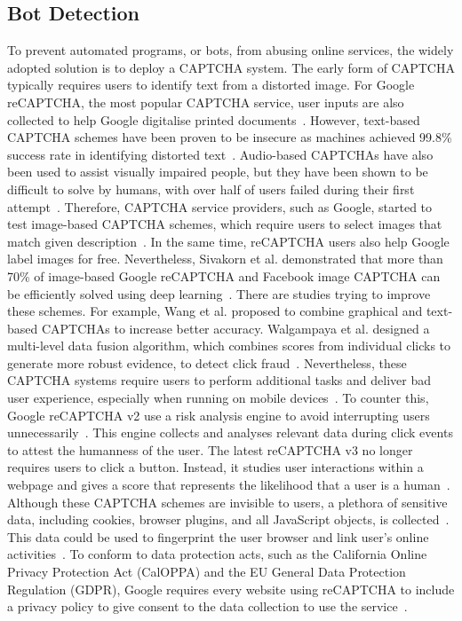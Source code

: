 \subsection{Bot Detection}

To prevent automated programs, or bots, from abusing online services, the widely adopted solution is to deploy a CAPTCHA system. The early form of CAPTCHA typically requires users to identify text from a distorted image. For Google reCAPTCHA, the most popular CAPTCHA service, user inputs are also collected to help Google digitalise printed documents~\cite{von2008recaptcha}. However, text-based CAPTCHA schemes have been proven to be insecure as machines achieved 99.8\% success rate in identifying distorted text~\cite{yan2008low,5395072,goodfellow2013multi}. Audio-based CAPTCHAs have also been used to assist visually impaired people, but they have been shown to be difficult to solve by humans, with over half of users failed during their first attempt~\cite{tasidou2012user}. Therefore, CAPTCHA service providers, such as Google, started to test image-based CAPTCHA schemes, which require users to select images that match given description~\cite{Google2014}. In the same time, reCAPTCHA users also help Google label images for free. Nevertheless, Sivakorn et al. demonstrated that more than 70\% of image-based Google reCAPTCHA and Facebook image CAPTCHA can be efficiently solved using deep learning~\cite{sivakorn2016robot,Zhou:2018:BGR:3280489.3280510}. There are studies trying to improve these schemes. For example, Wang et al. proposed to combine graphical and text-based CAPTCHAs to increase better accuracy. Walgampaya et al. designed a multi-level data fusion algorithm, which combines scores from individual clicks to generate more robust evidence, to detect click fraud~\cite{walgampaya2010real}. Nevertheless, these CAPTCHA systems require users to perform additional tasks and deliver bad user experience, especially when running on mobile devices~\cite{reynaga2013usability}. To counter this, Google reCAPTCHA v2 use a risk analysis engine to avoid interrupting users unnecessarily~\cite{Google2019}. This engine collects and analyses relevant data during click events to attest the humanness of the user. The latest reCAPTCHA v3 no longer requires users to click a button. Instead, it studies user interactions within a webpage and gives a score that represents the likelihood that a user is a human~\cite{Google2018}. Although these CAPTCHA schemes are invisible to users, a plethora of sensitive data, including cookies, browser plugins, and all JavaScript objects, is collected~\cite{LaraOReilly2015}. This data could be used to fingerprint the user browser and link user's online activities~\cite{gulyas2018extend,vastel2018fp}. To conform to data protection acts, such as the California Online Privacy Protection Act (CalOPPA) and the EU General Data Protection Regulation (GDPR), Google requires every website using reCAPTCHA to include a privacy policy to give consent to the data collection to use the service~\cite{Pegarella2018}.

